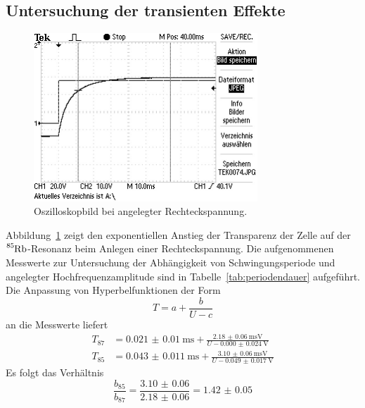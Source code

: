\subsection{Untersuchung der transienten Effekte}
%
\begin{figure}[htb]
  \centering
  \includegraphics[width=0.75\textwidth]{analysis/anstieg.png}
  \caption{Oszilloskopbild bei angelegter Rechteckspannung.}
  \label{fig:anstieg}
\end{figure}
%
Abbildung~\ref{fig:anstieg} zeigt den exponentiellen Anstieg der Transparenz
der Zelle auf der~$\ce{^85Rb}$-Resonanz beim Anlegen einer Rechteckspannung.
Die aufgenommenen Messwerte zur Untersuchung der Abhängigkeit von
Schwingungsperiode und angelegter Hochfrequenzamplitude sind in
Tabelle~\ref{tab:periodendauer} aufgeführt. Die Anpassung von
Hyperbelfunktionen der Form
%
\begin{equation}
  T=a+\frac{b}{U-c}
\end{equation}
%
an die Messwerte liefert
%
\begin{align}
  T_{87}&=\SI{0.021(10)}{\milli\second}
  +\frac{\SI{2.18(6)}{\milli\second\volt}}{U-\SI{0.000(24)}{\volt}} \\
  T_{85}&=\SI{0.043(11)}{\milli\second}
  +\frac{\SI{3.10(6)}{\milli\second\volt}}{U-\SI{0.049(17)}{\volt}}
\end{align}
%
Es folgt das Verhältnis
%
\begin{equation}
  \frac{b_{85}}{b_{87}}=\frac{\num{3.10(6)}}{\num{2.18(6)}}=\num{1.42(5)}
\end{equation}
%
